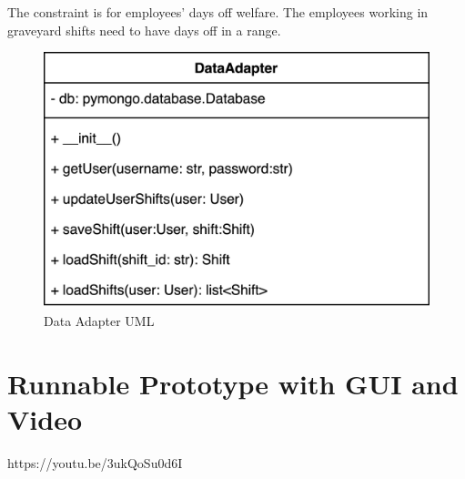 \documentclass[11pt, oneside]{article}   	%
\begin{document}
The constraint is for employees' days off welfare. The employees working in graveyard shifts need to have days off in a range.


\begin{figure}
\centering
\includegraphics[scale=0.05]{dataadapter}
\caption{Data Adapter UML}
\label{dataadapteruml}
\end{figure}

\section{Runnable Prototype with GUI and Video}
https://youtu.be/3ukQoSu0d6I
\end{document}
